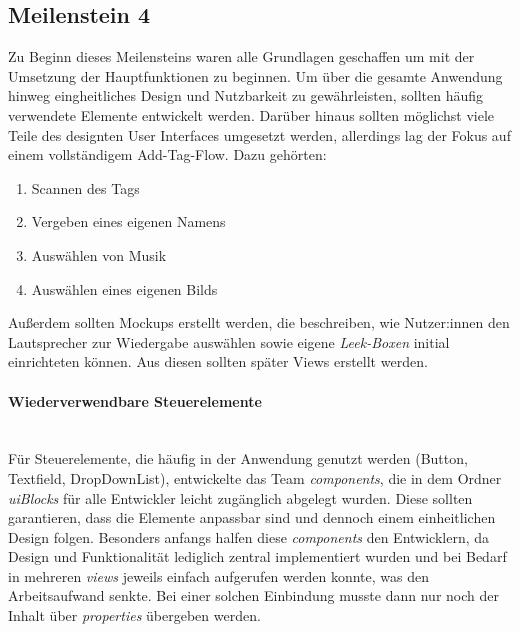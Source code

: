 \documentclass[10pt, a4paper]{article}
\begin{document}
\begin{onehalfspace}
\subsection{Meilenstein 4}
Zu Beginn dieses Meilensteins waren alle Grundlagen geschaffen um mit der Umsetzung der Hauptfunktionen zu beginnen.
Um über die gesamte Anwendung hinweg eingheitliches Design und Nutzbarkeit zu gewährleisten, sollten häufig verwendete Elemente entwickelt werden.
Darüber hinaus sollten möglichst viele Teile des designten User Interfaces umgesetzt werden, allerdings lag der Fokus auf einem vollständigem \glqq Add-Tag-Flow\grqq.
Dazu gehörten:
\begin{enumerate}
  \item Scannen des Tags
  \item Vergeben eines eigenen Namens
  \item Auswählen von Musik
  \item Auswählen eines eigenen Bilds
\end{enumerate}
Außerdem sollten Mockups erstellt werden, die beschreiben, wie Nutzer:innen den Lautsprecher zur Wiedergabe auswählen sowie eigene \textit{Leek-Boxen} initial einrichteten können. Aus diesen sollten später Views erstellt werden.


\paragraph*{Wiederverwendbare Steuerelemente}$~$ \\
Für Steuerelemente, die häufig in der Anwendung genutzt werden (Button, Textfield, DropDownList),
entwickelte das Team \textit{components}, die in dem Ordner \textit{uiBlocks} für alle Entwickler leicht zugänglich abgelegt wurden.
Diese sollten garantieren, dass die Elemente anpassbar sind und dennoch einem einheitlichen Design folgen.
Besonders anfangs halfen diese \textit{components} den Entwicklern, da Design und Funktionalität lediglich zentral implementiert wurden und bei Bedarf in mehreren \textit{views} jeweils einfach aufgerufen werden konnte, was den Arbeitsaufwand senkte.
Bei einer solchen Einbindung musste dann nur noch der Inhalt über \textit{properties} übergeben werden.


\end{onehalfspace}
\end{document}
